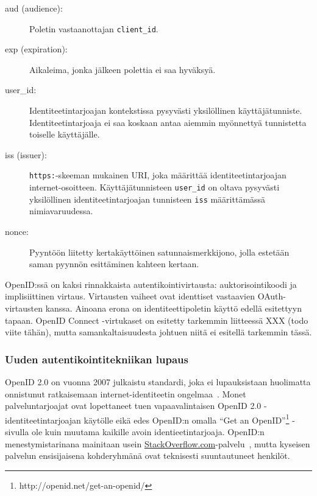 \documentclass[finnish,gradu]{tktltiki}
\begin{document}
  \begin{description}
    \item[aud (audience):] Poletin vastaanottajan \verb!client_id!.

    \item[exp (expiration):] Aikaleima, jonka jälkeen polettia ei saa hyväksyä.

    \item[user\_id:] Identiteetintarjoajan kontekstissa pysyvästi yksilöllinen käyttäjätunniste. Identiteetintarjoaja ei saa koskaan antaa aiemmin myönnettyä tunnistetta toiselle käyttäjälle.

    \item[iss (issuer):] \verb!https:!-skeeman mukainen URI, joka määrittää identiteetintarjoajan internet-osoitteen. Käyttäjätunnisteen \verb!user_id! on oltava pysyvästi yksilöllinen identiteetintarjoajan tunnisteen \verb!iss! määrittämässä nimiavaruudessa.

    \item[nonce:] Pyyntöön liitetty kertakäyttöinen satunnaismerkkijono, jolla estetään saman pyynnön esittäminen kahteen kertaan.
  \end{description}

  OpenID:ssä on kaksi rinnakkaista autentikointivirtausta: auktorisointikoodi ja implisiittinen virtaus. Virtausten vaiheet ovat identtiset vastaavien OAuth-virtausten kanssa. Ainoana erona on identiteettipoletin käyttö edellä esitettyyn tapaan. OpenID Connect -virtukaset on esitetty tarkemmin liitteessä XXX (todo viite tähän), mutta samankaltaisuudesta johtuen niitä ei esitellä tarkemmin tässä.

  \subsubsection{Uuden autentikointitekniikan lupaus} %
  \label{ssub:uuden_autentikointitekniikan_lupaus}

  OpenID 2.0 on vuonna 2007 julkaistu standardi, joka ei lupauksistaan huolimatta onnistunut ratkaisemaan internet-identiteetin ongelmaa~\cite{openid_failure_gilbertson_2011, openid_failure_obasanjo_2011, openid_failure_edge_2011, openid_failure_conery_2010, openid_failure_quora_2010, openid_failure_37signals_2011}. Monet palveluntarjoajat ovat lopettaneet tuen vapaavalintaisen OpenID 2.0 -identiteetintarjoajan käytölle eikä edes OpenID:n omalla ``Get an OpenID''\footnote{http://openid.net/get-an-openid/} -sivulla ole kuin muutama kaikille avoin identieetintarjoaja. OpenID:n menestymistarinana mainitaan usein \url{StackOverflow.com}-palvelu~\cite{openid_success_stackoverflow_2010, openid_failure_conery_2010}, mutta kyseisen palvelun ensisijaisena kohderyhmänä ovat teknisesti suuntautuneet henkilöt.
\end{document}
